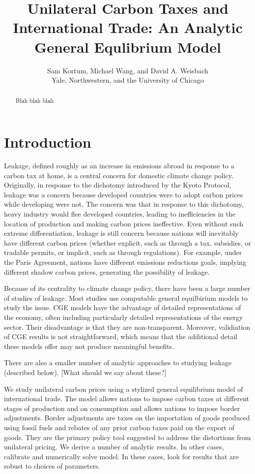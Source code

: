 \documentclass[notitlepage,12pt]{article}
\begin{document}
\title{Unilateral Carbon Taxes and International Trade: An Analytic General
Equlibrium Model}
\author{Sam Kortum, Michael Wang, and David A. Weisbach \\
Yale, Northwestern, and the University of Chicago}
\maketitle

\begin{abstract}
Blah blah blah
\end{abstract}

\section{Introduction}

Leakage, defined roughly as an increase in emissions abroad in response to a
carbon tax at home, is a central concern for domestic climate change policy.
Originally, in response to the dichotomy introduced by the Kyoto Protocol,
leakage was a concern because developed countries were to adopt carbon
prices while developing were not. The concern was that in response to this
dichotomy, heavy industry would flee developed countries, leading to
inefficiencies in the location of production and making carbon prices
ineffective. Even without such extreme differentiation, leakage is still
concern because nations will inevitably have different carbon prices
(whether explicit, such as through a tax, subsidies, or tradable permits, or
implicit, such as through regulations). For example, under the Paris
Agreement, nations have different emissions reductions goals, implying
different shadow carbon prices, generating the possibility of leakage. 

Because of its centrality to climate change policy, there have been a large
number of studies of leakage. Most studies use computable general
equilbirium models to study the issue. CGE models have the advantage of
detailed representations of the economy, often including particularly
detailed representations of the energy sector. Their disadvantage is that
they are non-transparent. Moreover, validiation of CGE results is not
straightforward, which means that the additional detail these models offer
may not produce meaningful benefits. 

There are also a smaller number of analytic approaches to studying leakage
(described below). [What should we say about these?]  

We study unilateral carbon prices using a stylized general equilibrium model
of international trade. The model allows nations to impose carbon taxes at
different stages of production and on consumption and allows nations to
impose border adjustments. Border adjustments are taxes on the importation
of goods produced using fossil fuels and rebates of any prior carbon taxes
paid on the export of goods. They are the primary policy tool suggested to
address the distortions from unilateral pricing. We derive a number of
analytic results. In other cases, calibrate and numerically solve model. In
these cases, look for results that are robust to choices of parameters.
\end{document}
